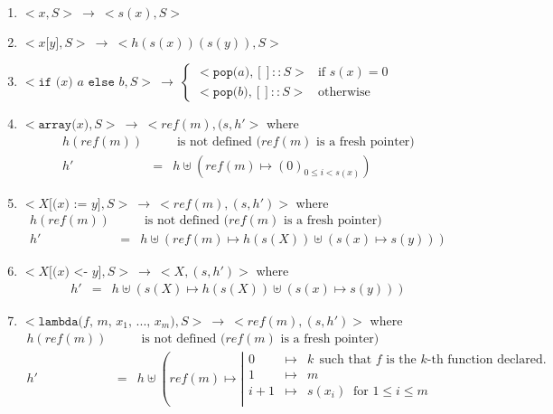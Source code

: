 \documentclass[12pt,a4paper]{article}
\newcommand{\cl}[1]{\texttt{#1}}
\begin{document}
\begin{enumerate}
\itemsep-0.2em
\item $<x,S> \ \longrightarrow \ < s(x), S> $
\item $<x \cl{[} y \cl{]} , S> \ \longrightarrow \ < h( s(x) )( s(y) ) , S >$
\item $<\cl{if (} x \cl{) } a \cl{ else } b, S>  \ \longrightarrow \ 
\left\lbrace \begin{array}{ll}
< \cl{pop(}a\cl{)} , [] :: S > & \text{if } s(x) = 0 \\
< \cl{pop(}b\cl{)} , [] :: S > & \text{otherwise}
\end{array} \right. $
\item $<\cl{array(} x \cl{)} , S > \ \longrightarrow \ < ref(m), (s , h' >$ where
\begin{eqnarray*}
h(ref(m)) & & \text{ is not defined  \ \ \ \ ($ref(m)$ is a fresh pointer)} \\
h' &=& h \uplus \left( ref(m) \mapsto (0)_{0 \leq i < s(x)} \right)
\end{eqnarray*}
\item $< X \cl{[(} x \cl{) := } y \cl{]} , S> \ \longrightarrow \ < ref(m), (s, h') >$ where
\begin{eqnarray*}
h(ref(m)) & & \text{ is not defined  \ \ \ \ ($ref(m)$ is a fresh pointer)} \\
h' &=& h \uplus \left( ref(m) \mapsto h( s(X) ) \uplus \left( s(x) \mapsto s(y) \right) \right)
\end{eqnarray*}
\item $< X \cl{[(} x \cl{) <- } y \cl{]} , S> \ \longrightarrow \ < X, (s, h') >$ where
\begin{eqnarray*}
h' &=& h \uplus \left( s(X) \mapsto h( s(X) ) \uplus \left( s(x) \mapsto s(y) \right) \right)
\end{eqnarray*}
\item $< \cl{lambda(} f \cl{, } m \cl{, } x_1 \cl{, } ... \cl{, } x_m \cl{)} , S > \ \longrightarrow \ < ref(m), (s, h') > $ where
\begin{eqnarray*}
h(ref(m)) & & \text{ is not defined  \ \ \ \ ($ref(m)$ is a fresh pointer)} \\
h' &=& h \uplus \left( ref(m) \mapsto \left| \begin{array}{ccl}
0 & \mapsto & k \ \ \text{such that $f$ is the $k$-th function declared.} \\
1 & \mapsto & m \\
i+1 & \mapsto & s(x_i) \ \text{ for } 1 \leq i \leq m \\

\end{array}
\end{eqnarray*}
\end{enumerate}
\end{document}
